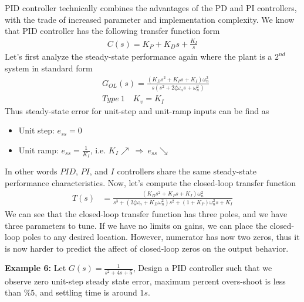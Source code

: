 \documentclass[twoside]{article}
\begin{document}
PID controller technically combines the advantages of 
the PD and PI controllers, with the trade of increased
parameter and implementation complexity. 
We know that PID controller has the following 
transfer function form
%
\begin{align*}
 C(s) = K_P + K_D s + \frac{K_I}{s}
\end{align*}
%
Let's first analyze the steady-state 
performance again where the plant is a $2^{nd}$ system in standard form
%
\begin{align*}
  &G_{OL}(s) = \frac{( K_D s^2 +  K_P s +  K_I ) \omega_n^2}{s (s^2 + 2 \zeta
    \omega_n s + \omega_n^2)}
\\
 &Type \ 1 \quad K_v = K_I
\end{align*}
% 
Thus steady-state error for unit-step and unit-ramp inputs can be find
as
\begin{itemize}
\item Unit step: $e_{ss} = 0$ 
\item Unit ramp: $e_{ss} = \frac{1}{K_I}$, i.e. $K_I \nearrow \ \Rightarrow \ e_{ss} \searrow$  
\end{itemize}
In other words $PID$, $PI$, and $I$ controllers share the same steady-state
performance characteristics. Now, let's compute the closed-loop transfer function
%
\begin{align*}
  T(s) &= \frac{( K_D s^2 +  K_P s +  K_I ) \omega_n^2}{ s^3 + (2 \zeta
         \omega_n + K_D \omega_n^2) s^2 + (1 + K_P) \omega_n^2 s +  K_I}
\end{align*}
%
We can see that the closed-loop transfer function has three poles, and
we have three parameters to tune. If we have no limits on gains, we
can place the closed-loop poles to any desired location. However,
numerator has now two zeros, thus it is now harder to predict the
affect of closed-loop zeros on the output behavior. 

\textbf{Example 6:} Let $G(s) = \frac{1}{s^2 + 4 s + 5}$, Design a
PID controller such that we observe zero unit-step steady state error, 
maximum percent overs-shoot is less than $\% 5$, and settling time 
is around $1 s$. 
\end{document}
